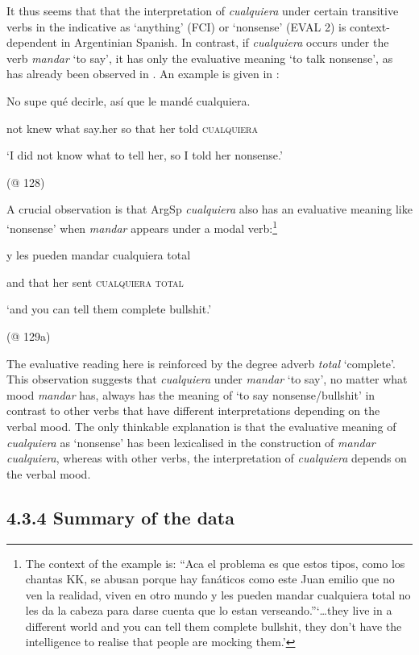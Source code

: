 It thus seems that that the interpretation of \textit{cualquiera} under certain transitive verbs in the indicative as ‘anything’ (FCI) or ‘nonsense’ (EVAL 2) is context-dependent in Argentinian Spanish. In contrast, if \textit{cualquiera} occurs under the verb \textit{mandar} ‘to say’, it has only the evaluative meaning ‘to talk nonsense’, as has already been observed in . An example is given in :

\label{bkm:Ref150786556}    No  supe  qué  decirle,  así  que  le  mandé  cualquiera.

    not  knew  what  say.her  so  that  her  told  \textsc{cualquiera}

    ‘I did not know what to tell her, so I told her nonsense.’

    (@ 128)

A crucial observation is that ArgSp \textit{cualquiera} also has an evaluative meaning like ‘nonsense’ when \textit{mandar} appears under a modal verb:\footnote{The context of the example is: “Aca el problema es que estos tipos, como los chantas KK, se abusan porque hay fanáticos como este Juan emilio que no ven la realidad, viven en otro mundo y les pueden mandar cualquiera total no les da la cabeza para darse cuenta que lo estan verseando.”‘…they live in a different world and you can tell them complete bullshit, they don’t have the intelligence to realise that people are mocking them.’}

    y  les  pueden  mandar  cualquiera total  

    and  that  her  sent  \textsc{cualquiera} \textsc{total}

    ‘and you can tell them complete bullshit.’

    (@ 129a)

The evaluative reading here is reinforced by the degree adverb \textit{total} ‘complete’. This observation suggests that \textit{cualquiera} under \textit{mandar} ‘to say’, no matter what mood \textit{mandar} has, always has the meaning of ‘to say nonsense/bullshit’ in contrast to other verbs that have different interpretations depending on the verbal mood. The only thinkable explanation is that the evaluative meaning of \textit{cualquiera} as ‘nonsense’ has been lexicalised in the construction of \textit{mandar cualquiera}, whereas with other verbs, the interpretation of \textit{cualquiera} depends on the verbal mood. 

\subsection{\textbf{4.3.4} \textbf{Summary} \textbf{of} \textbf{the} \textbf{data}}

